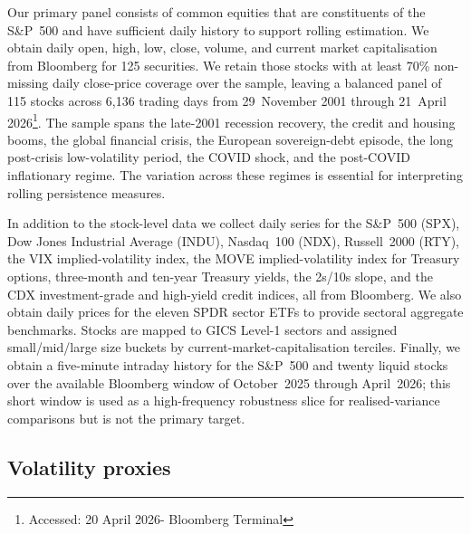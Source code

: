 \documentclass[11pt,a4paper]{article}
\begin{document}
Our primary panel consists of common equities that are constituents of
the S\&P~500 and have sufficient daily history to support rolling
estimation. We obtain daily open, high, low, close, volume, and current
market capitalisation from Bloomberg for 125 securities. We retain those
stocks with at least 70\% non-missing daily close-price coverage over the
sample, leaving a balanced panel of 115 stocks across 6,136 trading days
from 29~November 2001 through 21~April 2026\footnote{Accessed: 20 April 2026- Bloomberg Terminal}. The sample spans the
late-2001 recession recovery, the credit and housing booms, the global
financial crisis, the European sovereign-debt episode, the long
post-crisis low-volatility period, the COVID shock, and the post-COVID
inflationary regime. The variation across these regimes is essential for
interpreting rolling persistence measures.

In addition to the stock-level data we collect daily series for the
S\&P~500 (SPX), Dow Jones Industrial Average (INDU), Nasdaq~100 (NDX),
Russell~2000 (RTY), the VIX implied-volatility index, the MOVE
implied-volatility index for Treasury options, three-month and ten-year
Treasury yields, the 2s/10s slope, and the CDX investment-grade and
high-yield credit indices, all from Bloomberg. We also obtain daily
prices for the eleven SPDR sector ETFs to provide sectoral aggregate
benchmarks. Stocks are mapped to GICS Level-1 sectors and assigned
small/mid/large size buckets by current-market-capitalisation terciles.
Finally, we obtain a five-minute intraday history for the S\&P~500 and
twenty liquid stocks over the available Bloomberg window of October~2025
through April~2026; this short window is used as a high-frequency
robustness slice for realised-variance comparisons but is not the primary
target.

\subsection{Volatility proxies}
\end{document}
